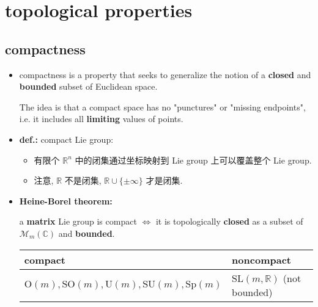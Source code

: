 \section{topological properties}
\subsection{compactness}
\begin{itemize}
	\item compactness is a property that seeks to generalize the notion of a \textbf{closed} and \textbf{bounded} subset of Euclidean space.
	
	The idea is that a compact space has no "punctures" or "missing endpoints", i.e. it includes all \textbf{limiting} values of points.
	
	\item \textbf{def.:} compact Lie group:
	\begin{itemize}
		\item 有限个 $\mathbb{R}^n$ 中的闭集通过坐标映射到 Lie group 上可以覆盖整个 Lie group.
		
		\item 注意, $\mathbb{R}$ 不是闭集, $\mathbb{R} \cup \{\pm \infty\}$ 才是闭集.
	\end{itemize}
	
	\item \textbf{Heine-Borel theorem:}
	
	a \textbf{matrix} Lie group is compact $\iff$ it is topologically \textbf{closed} as a subset of $\mathcal{M}_m(\mathbb{C})$ and \textbf{bounded}.
	
	\begin{center}
		\begin{tabularx}{\linewidth}{KK}
			\toprule 
			compact & noncompact \\
			\midrule 
			$\mathrm{O}(m), \mathrm{SO}(m), \mathrm{U}(m), \mathrm{SU}(m), \mathrm{Sp}(m)$ & $\mathrm{SL}(m, \mathbb{R})$ (not bounded) \\
			\bottomrule
		\end{tabularx}
	\end{center}
\end{itemize}

